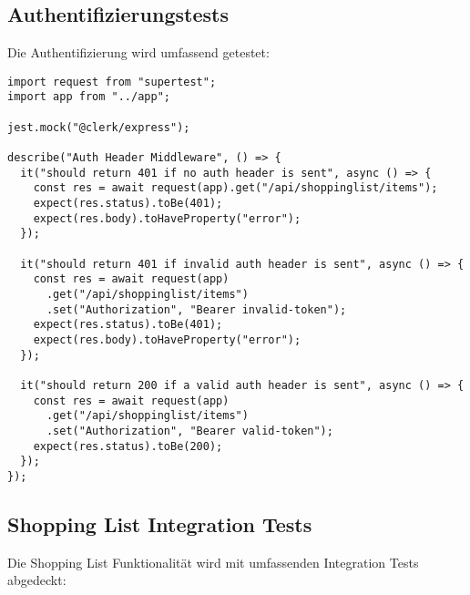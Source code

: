 \subsection{Authentifizierungstests}

Die Authentifizierung wird umfassend getestet:

\begin{lstlisting}[style=typescriptstyle,caption={Auth-Tests}]
import request from "supertest";
import app from "../app";

jest.mock("@clerk/express");

describe("Auth Header Middleware", () => {
  it("should return 401 if no auth header is sent", async () => {
    const res = await request(app).get("/api/shoppinglist/items");
    expect(res.status).toBe(401);
    expect(res.body).toHaveProperty("error");
  });

  it("should return 401 if invalid auth header is sent", async () => {
    const res = await request(app)
      .get("/api/shoppinglist/items")
      .set("Authorization", "Bearer invalid-token");
    expect(res.status).toBe(401);
    expect(res.body).toHaveProperty("error");
  });

  it("should return 200 if a valid auth header is sent", async () => {
    const res = await request(app)
      .get("/api/shoppinglist/items")
      .set("Authorization", "Bearer valid-token");
    expect(res.status).toBe(200);
  });
});
\end{lstlisting}

\subsection{Shopping List Integration Tests}

Die Shopping List Funktionalität wird mit umfassenden Integration Tests abgedeckt:

